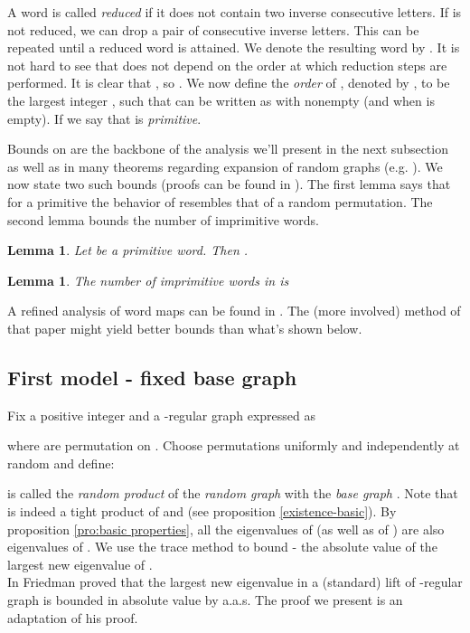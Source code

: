 \documentclass[12pt]{article}
\newtheorem{lemma}[theorem]{Lemma}
\newtheorem{open question}[theorem]{Open question}
\begin{document}
A word  is
called {\em reduced} if it does not contain two inverse consecutive letters. If  is not reduced, we can drop a pair of consecutive inverse letters. This can be repeated until a reduced word is attained.  We denote the resulting word by . It is not hard to see that  does not depend on the order at which reduction steps are performed. It is clear that , so . We now define the {\em order} of , denoted by , to be the largest integer , such that  can be written as  with nonempty  (and  when  is empty). If  we say that  is {\em primitive}.

Bounds on  are the backbone of the analysis we'll present in the next subsection as well as in many theorems regarding expansion of random graphs (e.g. \cite{Fri03}). We now state two such bounds (proofs can be found in \cite{HLW06}). The first lemma says that
for a primitive  the behavior of  resembles
that of a random permutation. The second lemma bounds the number of imprimitive words.
\begin{lemma}
Let  be a primitive word. Then .
\end{lemma}
\begin{lemma}
The number of imprimitive words in  is  
\end{lemma}
A refined analysis of word maps can be found in \cite{LP09}. The (more involved) method of that paper might yield better bounds than what's shown below.



\subsection{First model - fixed base graph}
Fix a positive integer  and a -regular graph  expressed as

where  are permutation on .
Choose permutations  uniformly and independently at random and define:


 is called the {\em random product} of
the {\em random graph}  with the {\em base graph} .
Note that  is indeed a tight product of  and  (see proposition \ref{existence-basic}).
By proposition \ref{pro:basic properties}, all the eigenvalues of  (as well as of ) are also eigenvalues of . We use the trace method to bound  - the absolute value of the largest new eigenvalue of .\\
In \cite{Fri03} Friedman proved that the largest new eigenvalue in a (standard) lift of -regular graph is bounded in absolute value by  a.a.s. The proof we present is an adaptation of his proof.
\end{document}
